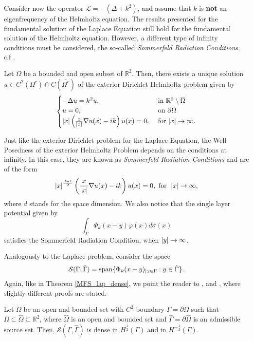 Consider now the operator \(\mathcal{L} = -(\Delta + k^2)\), and assume that \(k\) is \textbf{not} an eigenfrequency of the Helmholtz equation. The results presented for the fundamental solution of the Laplace Equation still hold for the fundamental solution of the Helmholtz equation. However, a different type of infinity conditions must be considered, the so-called \textit{Sommerfeld Radiation Conditions}, c.f \cite{colton2013integral}. 
\begin{theorem}
    Let \(\Omega\) be a bounded and open subset of \(\mathbb{R}^2\). Then, there exists a unique solution \(u \in C^2(\Omega^c) \cap C(\overline{\Omega^c})\) of the exterior Dirichlet Helmholtz problem given by
    \[
        \begin{cases}
            -\Delta u = k^2 u, & \text{ in }  \mathbb{R}^2\setminus \overline{\Omega}\\
            u = 0, & \text{ on }  \partial \Omega\\
            \abs{x} \left(\frac{x}{\abs{x}}\nabla u(x) - i k\right)u(x) = 0, & \text{ for }  \abs{x} \rightarrow \infty.
        \end{cases}
    \]
\end{theorem}
\begin{remark}
    Just like the exterior Dirichlet problem for the Laplace Equation, the Well-Posedness of the exterior Helmholtz Problem depends on the conditions at infinity. In this case, they are known as \textit{Sommerfeld Radiation Conditions} and are of the form
    \[
        \abs{x}^\frac{d-1}{2} \left(\frac{x}{\abs{x}}\nabla u(x) - i k \right)u(x) = 0, \text{ for } \; \abs{x} \rightarrow \infty,
    \]
    where \(d\) stands for the space dimension. We also notice that the single layer potential given by
    \[
        \int_\Gamma \Phi_k(x-y) \varphi(x) d\sigma(x)
    \]
    satisfies the Sommerfeld Radiation Condition, when \(\abs{y} \rightarrow \infty\).
\end{remark}
Analogously to the Laplace problem, consider the space
\[
    \mathcal{S}(\Gamma, \hat{\Gamma}) = \operatorname{span}\{\Phi_k(x-y)_{|x \in \Gamma} : y \in \hat{\Gamma}\}.
\]
Again, like in Theorem \ref{MFS_lap_dense}, we point the reader to \cite{alves2009choice}, \cite{svilen_phd} and \cite{alves2005new}, where slightly different proofs are stated.
\begin{theorem}
    Let \(\Omega\) be an open and bounded set with \(C^2\) boundary \(\Gamma = \partial \Omega\) such that \(\overline{\Omega} \subset \hat{\Omega} \subset \mathbb{R}^2\), where \(\hat{\Omega}\) is an open and bounded set and \(\hat{\Gamma} = \partial \hat{\Omega}\) is an admissible source set. Then, \(\mathcal{S}(\Gamma, \hat{\Gamma})\) is dense in \(H^\frac{1}{2}(\Gamma)\) and in \(H^{-\frac{1}{2}}(\Gamma)\).
\end{theorem}\label{MFS_helm_dense}
